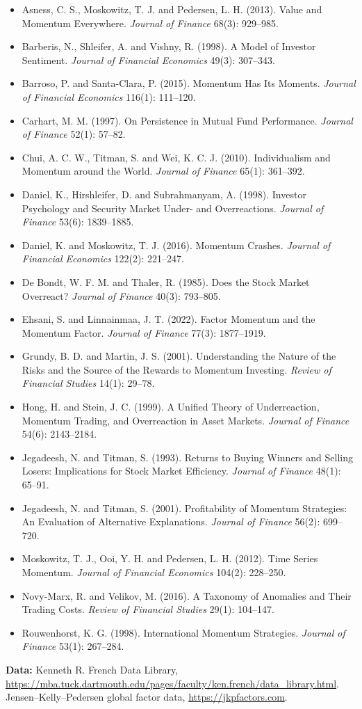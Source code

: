 \begin{itemize}
  \item Asness, C. S., Moskowitz, T. J. and Pedersen, L. H. (2013). Value and Momentum Everywhere. \emph{Journal of Finance} 68(3): 929--985.
  \item Barberis, N., Shleifer, A. and Vishny, R. (1998). A Model of Investor Sentiment. \emph{Journal of Financial Economics} 49(3): 307--343.
  \item Barroso, P. and Santa-Clara, P. (2015). Momentum Has Its Moments. \emph{Journal of Financial Economics} 116(1): 111--120.
  \item Carhart, M. M. (1997). On Persistence in Mutual Fund Performance. \emph{Journal of Finance} 52(1): 57--82.
  \item Chui, A. C. W., Titman, S. and Wei, K. C. J. (2010). Individualism and Momentum around the World. \emph{Journal of Finance} 65(1): 361--392.
  \item Daniel, K., Hirshleifer, D. and Subrahmanyam, A. (1998). Investor Psychology and Security Market Under- and Overreactions. \emph{Journal of Finance} 53(6): 1839--1885.
  \item Daniel, K. and Moskowitz, T. J. (2016). Momentum Crashes. \emph{Journal of Financial Economics} 122(2): 221--247.
  \item De Bondt, W. F. M. and Thaler, R. (1985). Does the Stock Market Overreact? \emph{Journal of Finance} 40(3): 793--805.
  \item Ehsani, S. and Linnainmaa, J. T. (2022). Factor Momentum and the Momentum Factor. \emph{Journal of Finance} 77(3): 1877--1919.
  \item Grundy, B. D. and Martin, J. S. (2001). Understanding the Nature of the Risks and the Source of the Rewards to Momentum Investing. \emph{Review of Financial Studies} 14(1): 29--78.
  \item Hong, H. and Stein, J. C. (1999). A Unified Theory of Underreaction, Momentum Trading, and Overreaction in Asset Markets. \emph{Journal of Finance} 54(6): 2143--2184.
  \item Jegadeesh, N. and Titman, S. (1993). Returns to Buying Winners and Selling Losers: Implications for Stock Market Efficiency. \emph{Journal of Finance} 48(1): 65--91.
  \item Jegadeesh, N. and Titman, S. (2001). Profitability of Momentum Strategies: An Evaluation of Alternative Explanations. \emph{Journal of Finance} 56(2): 699--720.
  \item Moskowitz, T. J., Ooi, Y. H. and Pedersen, L. H. (2012). Time Series Momentum. \emph{Journal of Financial Economics} 104(2): 228--250.
  \item Novy-Marx, R. and Velikov, M. (2016). A Taxonomy of Anomalies and Their Trading Costs. \emph{Review of Financial Studies} 29(1): 104--147.
  \item Rouwenhorst, K. G. (1998). International Momentum Strategies. \emph{Journal of Finance} 53(1): 267--284.
\end{itemize}

\textbf{Data:} Kenneth R. French Data Library, \url{https://mba.tuck.dartmouth.edu/pages/faculty/ken.french/data_library.html}. Jensen--Kelly--Pedersen global factor data, \url{https://jkpfactors.com}.
